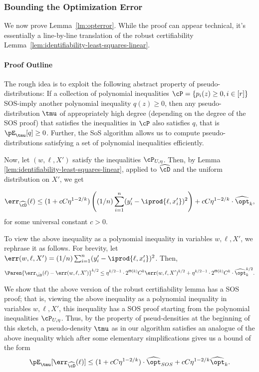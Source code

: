 \subsubsection{Bounding the Optimization Error} \label{sec:proofoftheorem}
We now prove Lemma~\ref{lm:opterror}. While the proof can appear technical, it's essentially a line-by-line translation of the robust certifiability Lemma~\ref{lem:identifiability-least-squares-linear}.%

\paragraph{Proof Outline} The rough idea is to exploit the following abstract property of pseudo-distributions: If a collection of polynomial inequalities $\cP = \{p_i(z) \geq 0, i \in [r]\}$ SOS-imply another polynomial inequality $q(z) \geq 0$, then any pseudo-distribution $\tmu$ of appropriately high degree (depending on the degree of the SOS proof) that satisfies the inequalities in $\cP$ also satisfies $q$, that is $\pE_{\tmu}[q] \geq 0$. Further, the SoS algorithm allows us to compute pseudo-distributions satisfying a set of polynomial inequalities efficiently. 

Now, let $(w,\ell,X')$ satisfy the inequalities $\cP_{U,\eta}$. Then, by Lemma \ref{lem:identifiability-least-squares-linear}, applied to $\widehat{\cD}$ and the uniform distribution on $X'$, we get 

$$\err_{\widehat{\cD}}(\ell) \leq (1 + c C \eta^{1-2/k}) \left((1/n) \sum_{i=1}^n  (y_i' - \iprod{\ell,x_i'})^2\right) + c C \eta^{1-2/k} \cdot \widehat{\opt}_k,$$
for some universal constant $c > 0$. 

To view the above inequality as a polynomial inequality in variables $w,\ell,X'$, we rephrase it as follows. For brevity, let $\err(w,\ell,X') = (1/n) \sum_{i=1}^n (y_i' - \iprod{\ell,x_i'})^2$. Then, 
$$ \Paren{\err_{\hat{\cD}}(\ell) - \err(w,\ell,X')}^{k/2}  \leq \eta^{k/2-1} \cdot 2^{\Theta(k)} C^{k} \err(w,\ell,X')^{k/2} + \eta^{k/2-1} \cdot 2^{\Theta(k)} C^{k} \cdot \widehat{\opt}_k^{k/2} .$$

We show that the above version of the robust certifiability lemma has a SOS proof; that is, viewing the above inequality as a polynomial inequality in variables $w,\ell,X'$, this inequality has a SOS proof starting from the polynomial inequalities $\cP_{U,\eta}$. Thus, by the property of pseud-densities at the beginning of this sketch, a pseudo-density $\tmu$ as in our algorithm satisfies an analogue of the above inequality which after some elementary simplifications gives us a bound of the form 
$$\pE_{\tmu}[ \err_{\widehat{\cD}}(\ell)] \leq (1 + c C \eta^{1-2/k}) \cdot \widehat{\opt}_{SOS} + c C \eta^{1-2/k} \widehat{\opt}_k.$$

